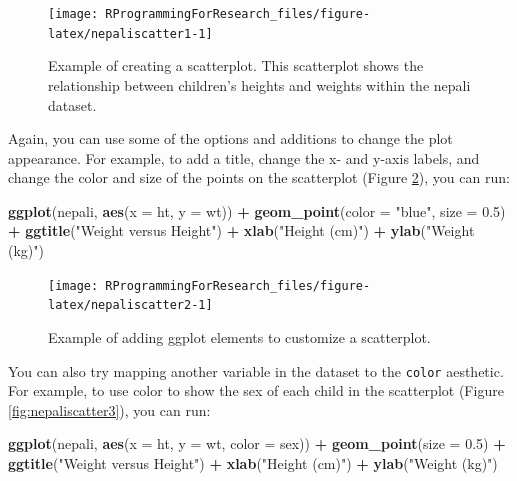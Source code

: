 \documentclass[]{book}
\makeatletter
\newenvironment{Shaded}{\begin{snugshade}}{\end{snugshade}}
\newcommand{\KeywordTok}[1]{\textcolor[rgb]{0.13,0.29,0.53}{\textbf{#1}}}
\newcommand{\DataTypeTok}[1]{\textcolor[rgb]{0.13,0.29,0.53}{#1}}
\newcommand{\FloatTok}[1]{\textcolor[rgb]{0.00,0.00,0.81}{#1}}
\newcommand{\StringTok}[1]{\textcolor[rgb]{0.31,0.60,0.02}{#1}}
\newcommand{\OperatorTok}[1]{\textcolor[rgb]{0.81,0.36,0.00}{\textbf{#1}}}
\newcommand{\NormalTok}[1]{#1}
\newenvironment{kframe}{%
\medskip{}
\setlength{\fboxsep}{.8em}
 \def\at@end@of@kframe{}%
 \ifinner\ifhmode%
  \def\at@end@of@kframe{\end{minipage}}%
  \begin{minipage}{\columnwidth}%
 \fi\fi%
 \def\FrameCommand##1{\hskip\@totalleftmargin \hskip-\fboxsep
 \colorbox{shadecolor}{##1}\hskip-\fboxsep
     \hskip-\linewidth \hskip-\@totalleftmargin \hskip\columnwidth}%
 \MakeFramed {\advance\hsize-\width
   \@totalleftmargin\z@ \linewidth\hsize
   \@setminipage}}%
 {\par\unskip\endMakeFramed%
 \at@end@of@kframe}
\renewenvironment{Shaded}{\begin{kframe}}{\end{kframe}}
\theoremstyle{definition}
\theoremstyle{definition}
\theoremstyle{definition}
\theoremstyle{remark}
\makeatother
\begin{document}
\begin{figure}

{\centering \texttt{[image: RProgrammingForResearch\_files/figure-latex/nepaliscatter1-1]} 

}

\caption{Example of creating a scatterplot. This scatterplot shows the relationship between children's heights and weights within the nepali dataset.}\label{fig:nepaliscatter1}
\end{figure}

Again, you can use some of the options and additions to change the plot
appearance. For example, to add a title, change the x- and y-axis
labels, and change the color and size of the points on the scatterplot
(Figure \ref{fig:nepaliscatter2}), you can run:

\begin{Shaded}
\begin{Highlighting}[]
\KeywordTok{ggplot}\NormalTok{(nepali, }\KeywordTok{aes}\NormalTok{(}\DataTypeTok{x =}\NormalTok{ ht, }\DataTypeTok{y =}\NormalTok{ wt)) }\OperatorTok{+}\StringTok{ }
\StringTok{  }\KeywordTok{geom_point}\NormalTok{(}\DataTypeTok{color =} \StringTok{"blue"}\NormalTok{, }\DataTypeTok{size =} \FloatTok{0.5}\NormalTok{) }\OperatorTok{+}\StringTok{ }
\StringTok{  }\KeywordTok{ggtitle}\NormalTok{(}\StringTok{"Weight versus Height"}\NormalTok{) }\OperatorTok{+}\StringTok{ }
\StringTok{  }\KeywordTok{xlab}\NormalTok{(}\StringTok{"Height (cm)"}\NormalTok{) }\OperatorTok{+}\StringTok{ }\KeywordTok{ylab}\NormalTok{(}\StringTok{"Weight (kg)"}\NormalTok{)}
\end{Highlighting}
\end{Shaded}

\begin{figure}

{\centering \texttt{[image: RProgrammingForResearch\_files/figure-latex/nepaliscatter2-1]} 

}

\caption{Example of adding ggplot elements to customize a scatterplot.}\label{fig:nepaliscatter2}
\end{figure}

You can also try mapping another variable in the dataset to the
\texttt{color} aesthetic. For example, to use color to show the sex of
each child in the scatterplot (Figure \ref{fig:nepaliscatter3}), you can
run:

\begin{Shaded}
\begin{Highlighting}[]
\KeywordTok{ggplot}\NormalTok{(nepali, }\KeywordTok{aes}\NormalTok{(}\DataTypeTok{x =}\NormalTok{ ht, }\DataTypeTok{y =}\NormalTok{ wt, }\DataTypeTok{color =}\NormalTok{ sex)) }\OperatorTok{+}\StringTok{ }
\StringTok{  }\KeywordTok{geom_point}\NormalTok{(}\DataTypeTok{size =} \FloatTok{0.5}\NormalTok{) }\OperatorTok{+}\StringTok{ }
\StringTok{  }\KeywordTok{ggtitle}\NormalTok{(}\StringTok{"Weight versus Height"}\NormalTok{) }\OperatorTok{+}\StringTok{ }
\StringTok{  }\KeywordTok{xlab}\NormalTok{(}\StringTok{"Height (cm)"}\NormalTok{) }\OperatorTok{+}\StringTok{ }\KeywordTok{ylab}\NormalTok{(}\StringTok{"Weight (kg)"}\NormalTok{)}
\end{Highlighting}
\end{Shaded}
\end{document}
